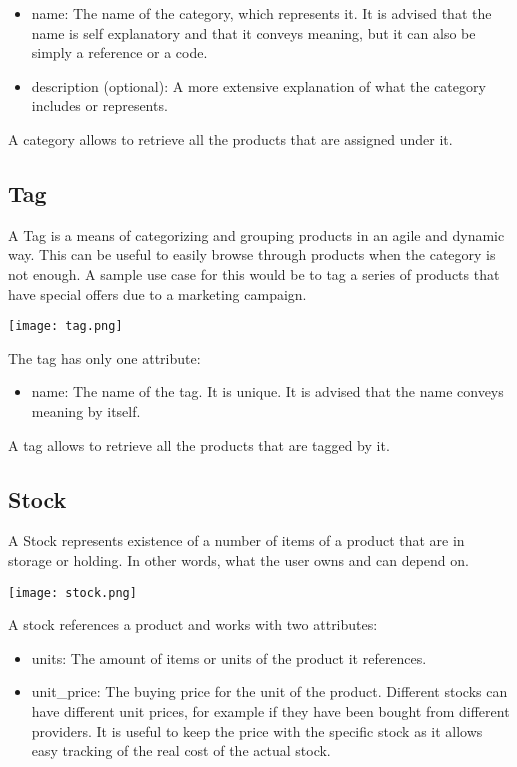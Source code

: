 \begin{itemize}
\item name: The name of the category, which represents it. It is advised that the name is self explanatory and that it conveys meaning, but it can also be simply a reference or a code.
\item description (optional): A more extensive explanation of what the category includes or represents.
\end{itemize}

A category allows to retrieve all the products that are assigned under it.

\subsection{Tag}
A Tag is a means of categorizing and grouping products in an agile and dynamic way. This can be useful to easily browse through products when the category is not enough. A sample use case for this would be to tag a series of products that have special offers due to a marketing campaign.
\begin{center}
\texttt{[image: tag.png]}
\end{center}
The tag has only one attribute:

\begin{itemize}
\item name: The name of the tag. It is unique. It is advised that the name conveys meaning by itself.
\end{itemize}

A tag allows to retrieve all the products that are tagged by it.

\subsection{Stock}
A Stock represents existence of a number of items of a product that are in storage or holding. In other words, what the user owns and can depend on. 
\begin{center}
\texttt{[image: stock.png]}
\end{center}
A stock references a product and works with two attributes:

\begin{itemize}
\item units: The amount of items or units of the product it references.
\item unit\_price: The buying price for the unit of the product. Different stocks can have different unit prices, for example if they have been bought from different providers. It is useful to keep the price with the specific stock as it allows easy tracking of the real cost of the actual stock.
\end{itemize}

